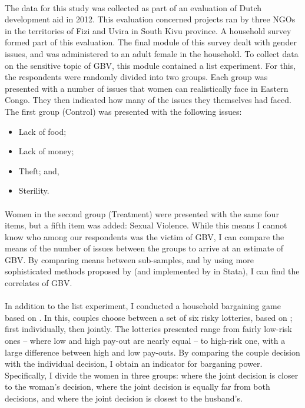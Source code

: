 \documentclass[11pt,a4paper]{scrartcl} %
\begin{document}
\paragraph{}
The data for this study was collected as part of an evaluation of Dutch development aid in 2012. This evaluation concerned projects ran by three NGOs in the territories of Fizi and Uvira in South Kivu province. A household survey formed part of this evaluation. The final module of this survey dealt with gender issues, and was administered to an adult female in the household.  To collect data on the sensitive topic of GBV, this module contained a list experiment. For this, the respondents were randomly divided into two groups. Each group was presented with a number of issues that women can realistically face in Eastern Congo. They then indicated how many of the issues they themselves had faced. The first group (Control) was presented with the following issues:
\begin{itemize}
	\item Lack of food;
	\item Lack of money;
	\item Theft; and,
	\item Sterility.
\end{itemize}

\paragraph{}
 Women in the second group (Treatment) were presented with the same four items, but a fifth item was added: Sexual Violence. While this means I cannot know who among our respondents was the victim of GBV, I can compare the means of the number of issues between the groups to arrive at an estimate of GBV. By comparing means between sub-samples, and by using more sophisticated methods proposed by \citet{Imai2011} (and implemented by \cite{Tsai2019} in Stata), I can find the correlates of GBV. 

 \paragraph{}
 In addition to the list experiment, I conducted a household bargaining game based on \cite{Martinsson2009}. In this, couples choose between a set of six risky lotteries, based on \cite{Holt2002}; first individually, then jointly. The lotteries presented range from fairly low-risk ones -- where low and high pay-out are nearly equal -- to high-risk one, with a large difference between high and low pay-outs. By comparing the couple decision with the individual decision, I obtain an indicator for barganing power. Specifically, I divide the women in three groups: where the joint decision is closer to the woman's decision, where the joint decision is equally far from both decisions, and where the joint decision is closest to the husband's.
\end{document}
